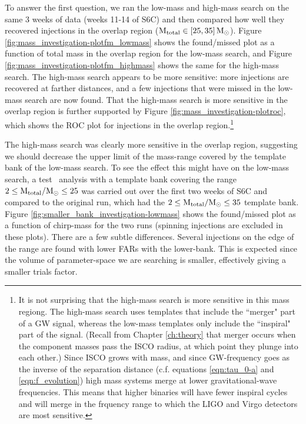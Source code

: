 To answer the first question, we ran the low-mass and high-mass search on the
same 3 weeks of data (weeks 11-14 of S6C) and then compared how well they
recovered injections in the overlap region ($\mathrm{M_{total}} \in [25,35]\,\mathrm{M_\odot}$).
Figure \ref{fig:mass_investigation-plotfm_lowmass} shows the found/missed plot
as a function of total mass in the overlap region for the low-mass search, and
Figure \ref{fig:mass_investigation-plotfm_highmass} shows the same for the
high-mass search. The high-mass search appears to be more sensitive: more
injections are recovered at farther distances, and a few injections that were
missed in the low-mass search are now found. That the high-mass search is more
sensitive in the overlap region is further supported by Figure
\ref{fig:mass_investigation-plotroc}, which shows the ROC plot for injections
in the overlap region.\footnote{It is not surprising that the high-mass search
is more sensitive in this mass regiong. The high-mass search uses templates
that include the ``merger" part of a GW signal, whereas the low-mass templates
only include the ``inspiral" part of the signal. (Recall from Chapter
\ref{ch:theory} that merger occurs when the component masses pass the \ac{ISCO}
radius, at which point they plunge into each other.) Since \ac{ISCO} grows with
mass, and since GW-frequency goes as the inverse of the separation distance
(c.f. equations \ref{eqn:tau_0-a} and \ref{eqn:f_evolution}) high mass systems
merge at lower gravitational-wave frequencies. This means that higher binaries
will have fewer inspiral cycles and will merge in the frquency range to which
the LIGO and Virgo detectors are most sensitive.}

The high-mass search was clearly more sensitive in the overlap region,
suggesting we should decrease the upper limit of the mass-range covered by the
template bank of the low-mass search. To see the effect this might have on the
low-mass search, a test \ihope~analysis with a template bank covering the range
$2 \leq \mathrm{M_{total}}/\mathrm{M_\odot} \leq 25$ was carried out over the first two weeks of S6C
and compared to the original run, which had the $2 \leq \mathrm{M_{total}}/\mathrm{M_\odot} \leq 35$
template bank. Figure \ref{fig:smaller_bank_investigation-lowmass} shows the
found/missed plot as a function of chirp-mass for the two runs (spinning
injections are excluded in these plots). There are a few subtle differences.
Several injections on the edge of the range are found with lower \acp{FAR} with
the lower-bank. This is expected since the volume of parameter-space we are
searching is smaller, effectively giving a smaller trials factor.


